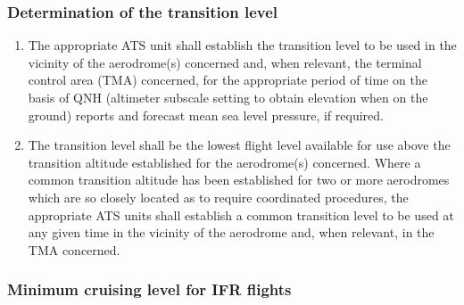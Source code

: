 \documentclass[../vATM.tex]{subfiles}
\begin{document}
    \subsubsection{Determination of the transition level}

    \begin{enumerate}
        \item The appropriate ATS unit shall establish the transition level to be used in the vicinity of the aerodrome(s) concerned and, when relevant, the terminal control area (TMA) concerned, for the appropriate period of time on the basis of QNH (altimeter subscale setting to obtain elevation when on the ground) reports and forecast mean sea level pressure, if required.
        \item The transition level shall be the lowest flight level available for use above the transition altitude established for the aerodrome(s) concerned. Where a common transition altitude has been established for two or more aerodromes which are so closely located as to require coordinated procedures, the appropriate ATS units shall establish a common transition level to be used at any given time in the vicinity of the aerodrome and, when relevant, in the TMA concerned.

    \end{enumerate}

    \subsubsection{Minimum cruising level for IFR flights}
\end{document}
